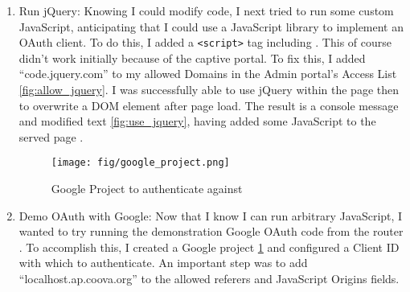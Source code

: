 \begin{enumerate}
\item{Run jQuery:}  Knowing I could modify code, I next tried to run some custom JavaScript,
anticipating that I could use a JavaScript library to implement an OAuth client. To do this, I added
a \texttt{<script>} tag including . This
of course didn't work initially because of the captive portal. To fix this, I added
``code.jquery.com'' to my allowed Domains in the Admin portal's Access List \ref{fig:allow_jquery}.
I was successfully able to use jQuery within the page then to overwrite a DOM element after page
load. The result is a console message and modified text \ref{fig:use_jquery}, having added some
JavaScript to the served page \cite{github:jquery}.

\begin{figure}[ht!]
\centering
\texttt{[image: fig/google\_project.png]}
\caption{Google Project to authenticate against}
\label{fig:google_project}
\end{figure}

\item{Demo OAuth with Google:}  Now that I know I can run arbitrary JavaScript, I wanted to try
running the demonstration Google OAuth code \cite{google:OAuthDemo} from the router
\cite{github:googleOauth}. To accomplish this, I created a Google project \ref{fig:google_project}
and configured a Client ID with which to authenticate. An important step was to add
``localhost.ap.coova.org'' to the allowed referers and JavaScript Origins fields.

\end{enumerate}